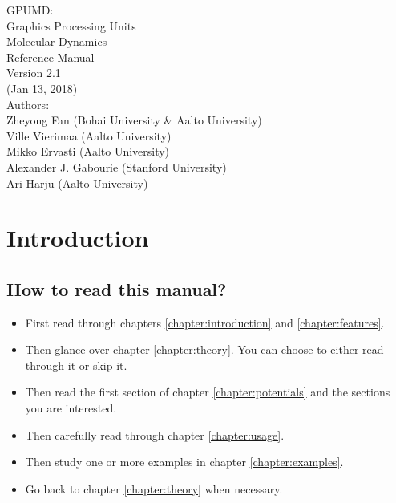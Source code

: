 \documentclass[12pt,a4paper]{report}
\begin{document}
\begin{center}
  \huge
  {
   \vspace*{1.0cm}
   GPUMD: \\
   Graphics Processing Units \\
   Molecular Dynamics\\
   \vspace*{1.0cm}
   Reference Manual\\
   \vspace*{1.0cm}
   Version 2.1\\
   \vspace*{1.0cm}
   (Jan 13, 2018)\\
  \vspace*{2.0cm}
  }
  \large
  {
  Authors: \\
  Zheyong Fan (Bohai University \& Aalto University)\\
  Ville Vierimaa (Aalto University)\\
  Mikko Ervasti (Aalto University)\\
  Alexander J. Gabourie (Stanford University)\\
  Ari Harju (Aalto University)\\
  }
  \vspace*{1.0cm}
\end{center}


\tableofcontents


\chapter{Introduction\label{chapter:introduction}}

\section{How to read this manual?}

\begin{itemize}
\item First read through chapters \ref{chapter:introduction} and \ref{chapter:features}.
\item Then glance over chapter \ref{chapter:theory}. You can choose to either read through it or skip it.
\item Then read the first section of chapter \ref{chapter:potentials} and the sections you are interested.
\item Then carefully read through chapter \ref{chapter:usage}.
\item Then study one or more examples in chapter \ref{chapter:examples}.
\item Go back to chapter \ref{chapter:theory} when necessary.
\end{itemize}
\end{document}
